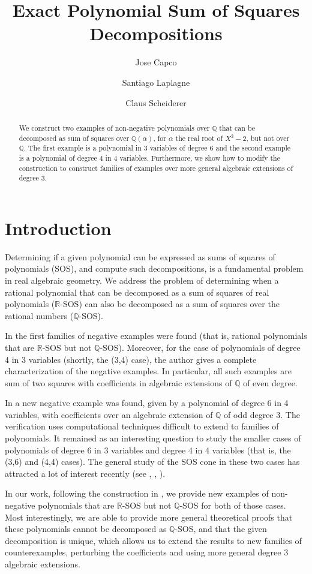 \documentclass[a4paper,11pt]{amsart}%
\title{}
\date{}
\title{Exact Polynomial Sum of Squares Decompositions}
\author{Jose Capco}
\author{Santiago Laplagne}
\author{Claus Scheiderer}
\newcommand\Q{\mathbb{Q}}
\newcommand\R{\mathbb{R}}
\theoremstyle{definition}
\begin{document}
\begin{abstract}
We construct two examples of non-negative polynomials over $\Q$ that can be decomposed as sum of squares over $\Q(\alpha)$, for $\alpha$ the real root of $X^3-2$, but not over $\Q$. The first example is a polynomial in $3$ variables of degree $6$ and the second example is a polynomial of degree $4$ in $4$ variables. Furthermore, we show how to modify the construction to construct families of examples over more general algebraic extensions of degree 3.
\end{abstract}
\maketitle

\section{Introduction}
Determining if a given polynomial can be expressed as sums of squares of polynomials (SOS), and compute such decompositions, is a fundamental problem in real algebraic geometry. We address the problem of determining when a rational polynomial that can be decomposed as a sum of squares of real polynomials ($\R$-SOS) can also be decomposed as a sum of squares over the rational numbers ($\Q$-SOS).

In \cite{scheiderer} the first families of negative examples were found (that is, rational polynomials that are $\R$-SOS but not $\Q$-SOS). Moreover, for the case of polynomials of degree 4 in 3 variables (shortly, the (3,4) case), the author gives a complete characterization of the negative examples. In particular, all such examples are sum of two squares with coefficients in algebraic extensions of $\Q$ of even degree.

In \cite{laplagne} a new negative example was found, given by a polynomial of degree 6 in 4 variables, with coefficients over an algebraic extension of $\Q$ of odd degree 3. The verification uses computational techniques difficult to extend to families of polynomials. It remained as an interesting question to study the smaller cases of polynomials of degree 6 in 3 variables and degree 4 in 4 variables (that is, the (3,6) and (4,4) cases). The general study of the SOS cone in these two cases has attracted a lot of interest recently (see \cite{blekherman}, \cite{blekherman2}, \cite{capco}).

In our work, following the construction in \cite{laplagne}, we provide new examples of non-negative polynomials that are $\R$-SOS but not $\Q$-SOS for both of those cases. Most interestingly, we are able to provide more general theoretical proofs that these polynomials cannot be decomposed as $\Q$-SOS, and that the given decomposition is unique, which allows us to extend the results to new families of counterexamples, perturbing the coefficients and using more general degree 3 algebraic extensions.
\end{document}
